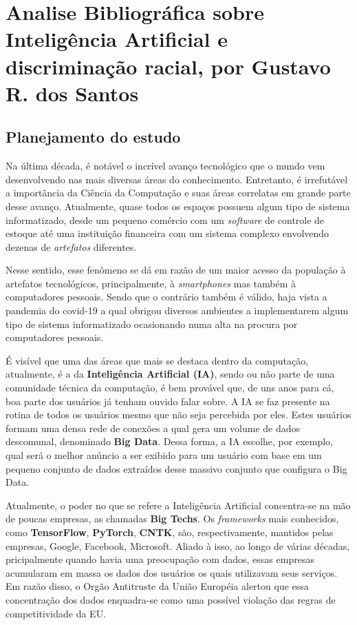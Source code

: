 \chapter{Analise Bibliográfica sobre Inteligência Artificial e discriminação racial, por Gustavo R. dos Santos\label{chap:bibliometria:gutorsantos}}

\section{Planejamento do estudo}

Na última década, é notável o incrível avanço tecnológico que o mundo vem desenvolvendo nas mais diversas áreas do conhecimento. Entretanto, é irrefutável a importância da Ciência da Computação e suas áreas correlatas em grande parte desse avanço. Atualmente, quase todos os espaços possuem algum tipo de sistema informatizado, desde um pequeno comércio com um \textit{software} de controle de estoque até uma instituição financeira com um sistema complexo envolvendo dezenas de \textit{artefatos} diferentes. 

Nesse sentido, esse fenômeno se dá em razão de um maior acesso da população à artefatos tecnológicos, principalmente, à \textit{smartphones} mas também à computadores pessoais. Sendo que o contrário também é válido, haja vista a pandemia do covid-19 a qual obrigou diversos ambientes a implementarem algum tipo de sistema informatizado ocasionando numa alta na procura por computadores pessoais. 

É visível que uma das áreas que mais se destaca dentro da computação, atualmente, é a da \textbf{Inteligência Artificial (IA)}, sendo ou não parte de uma comunidade técnica da computação, é bem provável que, de uns anos para cá, boa parte dos usuários já tenham ouvido falar sobre. A IA se faz presente na rotina de todos os usuários mesmo que não seja percebida por eles. Estes usuários formam uma densa rede de conexões a qual gera um volume de dados descomunal, denominado \textbf{Big Data}. Dessa forma, a IA escolhe, por exemplo, qual será o melhor anúncio a ser exibido para um usuário com base em um pequeno conjunto de dados extraídos desse massivo conjunto que configura o Big Data.

Atualmente, o poder no que se refere a Inteligência Artificial concentra-se na mão de poucas empresas, as chamadas \textbf{Big Techs}. Os \textit{frameworks} mais conhecidos, como \textbf{TensorFlow}, \textbf{PyTorch}, \textbf{CNTK}, são, respectivamente, mantidos pelas empresas, Google, Facebook, Microsoft. Aliado à isso, ao longo de várias décadas, pricipalmente quando havia uma preocupação com dados, essas empresas acumularam em massa os dados dos usuários os quais utilizavam seus serviços. Em razão disso, o Orgão Antitruste da União Européia alertou que essa concentração dos dados enquadra-se como uma possível violação das regras de competitividade da EU.

